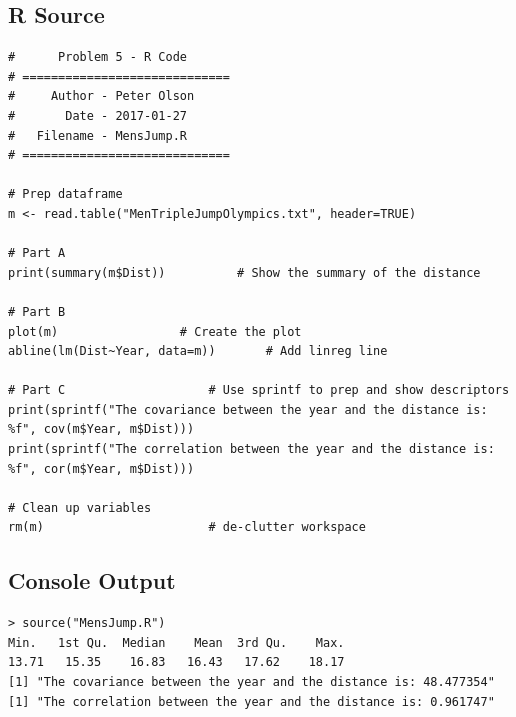 \documentclass{article}
\begin{document}
	\subsection*{R Source}
\begin{verbatim}
#      Problem 5 - R Code
# =============================
#     Author - Peter Olson
#       Date - 2017-01-27
#   Filename - MensJump.R
# =============================

# Prep dataframe
m <- read.table("MenTripleJumpOlympics.txt", header=TRUE)

# Part A
print(summary(m$Dist))			# Show the summary of the distance

# Part B
plot(m)					# Create the plot
abline(lm(Dist~Year, data=m))		# Add linreg line

# Part C					# Use sprintf to prep and show descriptors
print(sprintf("The covariance between the year and the distance is: %f", cov(m$Year, m$Dist)))
print(sprintf("The correlation between the year and the distance is: %f", cor(m$Year, m$Dist)))

# Clean up variables
rm(m)						# de-clutter workspace
\end{verbatim}
\subsection*{Console Output}
\begin{verbatim}
> source("MensJump.R")
Min.   1st Qu.  Median    Mean  3rd Qu.    Max. 
13.71   15.35    16.83   16.43   17.62    18.17 
[1] "The covariance between the year and the distance is: 48.477354"
[1] "The correlation between the year and the distance is: 0.961747"
\end{verbatim}
\end{document}
